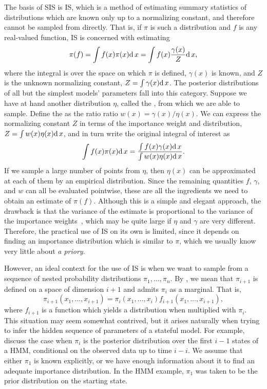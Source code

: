 The basis of \gls{SIS} is \gls{IS}, which is a method of estimating summary
statistics of distributions which are known only up to a normalizing constant,
and therefore cannot be sampled from directly. That is, if $\pi$ is such a
distribution and $f$ is any real-valued function, \gls{IS} is concerned with
estimating
\[
  \pi(f) = \int f(x)\pi(x)\mathrm{d}\, x = \int f(x) \frac{\gamma(x)}{Z} \mathrm{d}\, x,
\]
where the integral is over the space on which $\pi$ is defined, $\gamma(x)$ is
known, and $Z$ is the unknown normalizing constant, $Z = \int \gamma(x) \mathrm{d}\, x$.
The posterior distributions of all but the simplest models' parameters fall
into this category. Suppose we have at hand another distribution $\eta$, called
the , from which we are able to sample. Define
the  as the ratio ratio $w(x) = \gamma(x)/\eta(x)$. We
can express the normalizing constant $Z$ in terms of the importance weight and
distribution, $Z = \int w(x) \eta(x) \mathrm{d}\, x$, and in turn write the original
integral of interest as
\[
  \int f(x) \pi(x) \mathrm{d}\, x = \frac{\int f(x) \gamma(x) \mathrm{d}\, x}
                               {\int w(x) \eta(x) \mathrm{d}\, x}.
\]
If we sample a large number of points from $\eta$, then $\eta(x)$ can be
approximated at each of them by an empirical distribution. Since the remaining
quantities $f$, $\gamma$, and $w$ can all be evaluated pointwise, these are all
the ingredients we need to obtain an estimate of $\pi(f)$. Although this is a
simple and elegant approach, the drawback is that the variance of the estimate
is proportional to the variance of the importance
weights~\autocite{liu2008monte}, which may be quite large if $\eta$ and
$\gamma$ are very different. Therefore, the practical use of \gls{IS} on its
own is limited, since it depends on finding an importance distribution which is
similar to $\pi$, which we usually know very little about \textit{a priory}.

However, an ideal context for the use of \gls{IS} is when we want to sample
from a sequence of nested probability distributions $\pi_1, \ldots, \pi_n$.
By , we mean that $\pi_{i+1}$ is defined on a space of dimension
$i+1$ and admits $\pi_i$ as a marginal. That is,
\[
  \pi_{i+1}(x_1, \ldots, x_{i+1}) = \pi_i(x_1, \ldots, x_i) f_{i+1}(x_1, \ldots, x_{i+1}),
\]
where $f_{i+1}$ is a function which yields a distribution when multiplied with
$\pi_i$. This situation may seem somewhat contrived, but it arises naturally
when trying to infer the hidden sequence of parameters of a stateful model. For
example, \textcite{doucet2001introduction} discuss the case when $\pi_i$ is the
posterior distribution over the first $i-1$ states of a \gls{HMM}, conditional
on the observed data up to time $i-i$. We assume that either $\pi_1$ is known
explicitly, or we have enough information about it to find an adequate
importance distribution. In the \gls{HMM} example, $\pi_1$ was taken to be the
prior distribution on the starting state.
